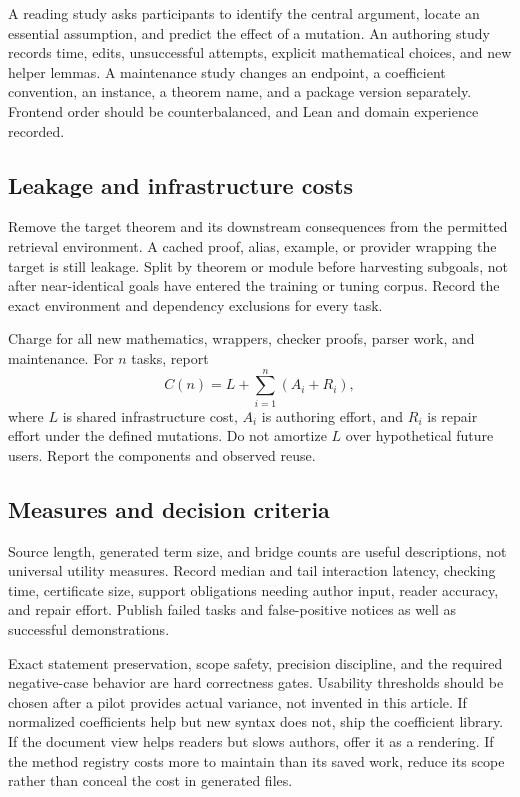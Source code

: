 \documentclass[11pt,a4paper]{article}
\theoremstyle{definition}
\begin{document}
A reading study asks participants to identify the central argument, locate an
essential assumption, and predict the effect of a mutation. An authoring study
records time, edits, unsuccessful attempts, explicit mathematical choices, and
new helper lemmas. A maintenance study changes an endpoint, a coefficient
convention, an instance, a theorem name, and a package version separately.
Frontend order should be counterbalanced, and Lean and domain experience recorded.

\subsection{Leakage and infrastructure costs}
Remove the target theorem and its downstream consequences from the permitted
retrieval environment. A cached proof, alias, example, or provider wrapping the
target is still leakage. Split by theorem or module before harvesting subgoals,
not after near-identical goals have entered the training or tuning corpus.
Record the exact environment and dependency exclusions for every task.

Charge for all new mathematics, wrappers, checker proofs, parser work, and
maintenance. For \(n\) tasks, report
\[
 C(n)=L+\sum_{i=1}^{n}(A_i+R_i),
\]
where \(L\) is shared infrastructure cost, \(A_i\) is authoring effort, and
\(R_i\) is repair effort under the defined mutations. Do not amortize \(L\)
over hypothetical future users. Report the components and observed reuse.

\subsection{Measures and decision criteria}
Source length, generated term size, and bridge counts are useful descriptions,
not universal utility measures. Record median and tail interaction latency,
checking time, certificate size, support obligations needing author input,
reader accuracy, and repair effort. Publish failed tasks and false-positive
notices as well as successful demonstrations.

Exact statement preservation, scope safety, precision discipline, and the required
negative-case behavior are hard correctness gates. Usability thresholds should
be chosen after a pilot provides actual variance, not invented in this article.
If normalized coefficients help but new syntax does not, ship the coefficient
library. If the document view helps readers but slows authors, offer it as a
rendering. If the method registry costs more to maintain than its saved work,
reduce its scope rather than conceal the cost in generated files.
\end{document}
